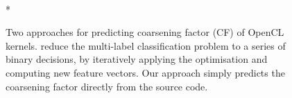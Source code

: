 \begin{figure}
  \centering %
  \\*%
  \caption[Predicting OpenCL thread coarsening factors.]{%
      Two approaches for predicting coarsening factor (CF) of OpenCL kernels.
      \citeauthor{Magni2014} reduce the multi-label classification problem to a
      series of binary decisions, by iteratively applying the optimisation and
      computing new feature vectors. Our approach simply predicts the coarsening
      factor directly from the source code.%
  }
  \label{fig:cascading-nn}
\end{figure}

